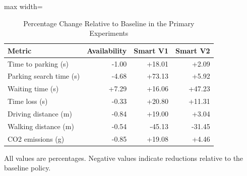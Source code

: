 \begin{table}[t]
\centering
\caption{Percentage Change Relative to Baseline in the Primary Experiments}
\label{tab:primary_percentage_changes}
\small
\setlength{\tabcolsep}{4pt}
\begin{adjustbox}{max width=\textwidth}

\begin{tabular}{lrrr}
\toprule
Metric & Availability & Smart V1 & Smart V2\\
\midrule
Time to parking (s) & -1.00 & +18.01 & +2.09\\
Parking search time (s) & -4.68 & +73.13 & +5.92\\
Waiting time (s) & +7.29 & +16.06 & +47.23\\
Time loss (s) & -0.33 & +20.80 & +11.31\\
Driving distance (m) & -0.84 & +19.00 & +3.04\\
\addlinespace
Walking distance (m) & -0.54 & -45.13 & -31.45\\
CO2 emissions (g) & -0.85 & +19.08 & +4.46\\
\bottomrule
\end{tabular}
\end{adjustbox}
\par\smallskip
\begin{minipage}{\textwidth}
\footnotesize
All values are percentages. Negative values indicate reductions relative to the baseline policy.
\end{minipage}
\end{table}
